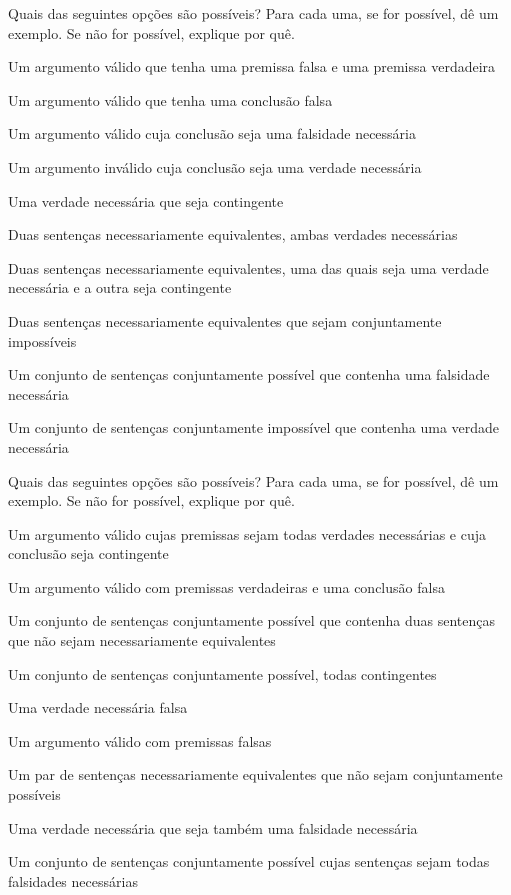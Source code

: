 \problempart
\label{pr.EnglishCombinations2}
Quais das seguintes opções são possíveis? Para cada uma, se for possível, dê um exemplo. Se não for possível, explique por quê.
\begin{compactlist}
\item Um argumento válido que tenha uma premissa falsa e uma premissa verdadeira

\item Um argumento válido que tenha uma conclusão falsa

\item Um argumento válido cuja conclusão seja uma falsidade necessária

\item Um argumento inválido cuja conclusão seja uma verdade necessária

\item Uma verdade necessária que seja contingente

\item Duas sentenças necessariamente equivalentes, ambas verdades necessárias

\item Duas sentenças necessariamente equivalentes, uma das quais seja uma verdade necessária e a outra seja contingente

\item Duas sentenças necessariamente equivalentes que sejam conjuntamente impossíveis

\item Um conjunto de sentenças conjuntamente possível que contenha uma falsidade necessária

\item Um conjunto de sentenças conjuntamente impossível que contenha uma verdade necessária
\end{compactlist}

\problempart
Quais das seguintes opções são possíveis? Para cada uma, se for possível, dê um exemplo. Se não for possível, explique por quê.

\begin{compactlist}
\item Um argumento válido cujas premissas sejam todas verdades necessárias e cuja conclusão seja contingente
\item Um argumento válido com premissas verdadeiras e uma conclusão falsa
\item Um conjunto de sentenças conjuntamente possível que contenha duas sentenças que não sejam necessariamente equivalentes
\item Um conjunto de sentenças conjuntamente possível, todas contingentes
\item Uma verdade necessária falsa
\item Um argumento válido com premissas falsas
\item Um par de sentenças necessariamente equivalentes que não sejam conjuntamente possíveis
\item Uma verdade necessária que seja também uma falsidade necessária
\item Um conjunto de sentenças conjuntamente possível cujas sentenças sejam todas falsidades necessárias
\end{compactlist}

